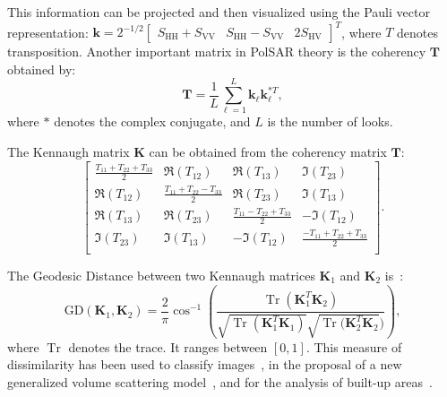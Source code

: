 \documentclass[conference]{IEEEtran}
\DeclareMathOperator{\Tr}{Tr}
\begin{document}
This information can be projected and then visualized using the Pauli vector representation:
$\bm{k} = 2^{-1/2} 
\begin{bmatrix}
S_{\text{HH}} + S_{\text{VV}} &S_{\text{HH}} - S_{\text{VV}} &2S_{\text{HV}}
\end{bmatrix}^T
$, 
where $T$ denotes transposition. 
Another important matrix in PolSAR theory is the coherency $\bm{T}$ obtained by:
$$
\bm{T} = \frac{1}{L} \sum_{\ell=1}^{L}\textbf{k}_\ell \textbf{k}_\ell^{*T},
$$
where $*$ denotes the complex conjugate, and $L$ is the number of looks.

The Kennaugh matrix $\bm{K}$ can be obtained from the coherency matrix $\bm{T}$:
\[
\begin{bmatrix}
\frac{ T_{11} + T_{22} + T_{33} }{2} & \Re(T_{12}) & \Re(T_{13}) & \Im(T_{23})\\
\Re(T_{12}) & \frac{T_{11} + T_{22} - T_{33}}{2} & \Re(T_{23}) & \Im(T_{13})\\
\Re(T_{13}) & \Re(T_{23}) & \frac{ T_{11} - T_{22} + T_{33} }{2} & -\Im(T_{12})\\
\Im(T_{23}) & \Im(T_{13}) & -\Im(T_{12}) & \frac{ -T_{11} + T_{22} + T_{33} }{2}\\
\end{bmatrix}
.\]

The Geodesic Distance between two Kennaugh matrices $\bm K_1$ and $\bm K_2$ is~\cite{ClassificationPolSARGeodesic}: 
\begin{displaymath}
\text{GD}(\bm K_1, \bm K_2) = \frac{2}{\pi} \cos^{-1} \left(\frac{\Tr(\bm K_1^T \bm K_2)}{\sqrt{\Tr(\bm K_1^T \bm K_1)} \sqrt{\Tr(\bm K_2^T \bm K_2})} \right),
\end{displaymath}
where $\Tr$ denotes the trace.
It ranges between $[0,1]$.
This measure of dissimilarity has been used to 
classify images~\cite{ClassificationPolSARGeodesic},
in the proposal of a new generalized volume scattering model~\cite{AGeneralizedVolumeScatteringModelBasedVegetationIndexfromPolarimetricSARData2019},
and for the analysis of built-up areas~\cite{NovelTechniquesforBuiltupAreaExtractionfromPolarimetricSARImages2019}.
\end{document}
